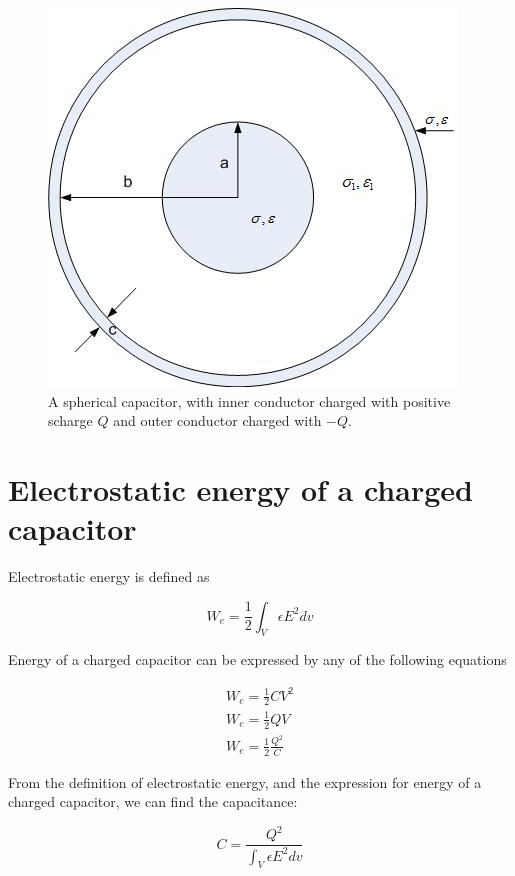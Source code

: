 \documentclass{ximera}
\begin{document}
\begin{figure}[htbp]
\begin{center}
\includegraphics[scale=1]{../jpg/sphereandcylcc.jpg}
\end{center}
\caption{A spherical capacitor, with inner conductor charged with positive scharge $Q$ and outer conductor charged with $-Q.$}
\label{fig:sphericalCapacitor}
\end{figure}


\section{Electrostatic energy of a charged capacitor}

Electrostatic energy is defined as

\begin{equation}
W_e=\frac{1}{2} \int_V \epsilon E^2 dv
\end{equation}

Energy of a charged capacitor can be expressed by any of the following equations

\begin{eqnarray}
W_e=\frac{1}{2} CV^2 \\
W_e=\frac{1}{2} QV \\
W_e=\frac{1}{2} \frac{Q^2}{C} 
\end{eqnarray}

From the definition of electrostatic energy, and the expression for energy of a charged capacitor, we can find the capacitance:

\begin{equation}
C=\frac{Q^2}{\int_V \epsilon E^2 dv} \label{eq:capacitanceEn}
\end{equation}
\end{document}
